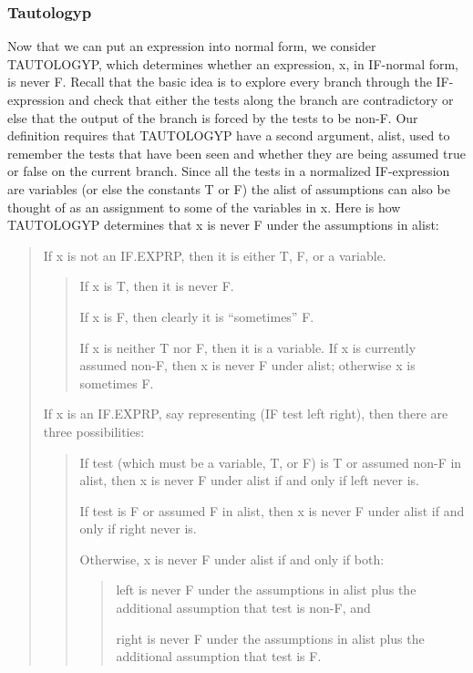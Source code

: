 \documentclass[10pt]{book}
\newenvironment{pubcrown}{\begin{quote}}{\end{quote}}
\begin{document}
\subsubsection{Tautologyp}
Now that we can put an expression into normal form, we
consider TAUTOLOGYP, which
determines whether an expression, x, in IF-normal form, is never F.
Recall that the basic idea is to explore
every branch through the IF-expression and check that either
the tests along the branch are contradictory or else that the output
of the branch is forced by the tests to be non-F.  Our definition
requires that TAUTOLOGYP have a second argument, alist,
used to remember the tests that have been seen and whether
they are being assumed true or false on the current branch. 
Since all the tests in a normalized IF-expression are variables (or else
the constants T or F) the alist of assumptions can also be thought of as an assignment to some
of the variables in x.
Here is how TAUTOLOGYP determines that x is never F under the assumptions in alist:
\begin{pubcrown}
If x is not an IF.EXPRP, then it is either T, F, or a variable.
\begin{pubcrown}
If x is T, then it is never F.

If x is F, then clearly it is ``sometimes'' F.

If x is neither T nor F, then it is a variable. If x is currently
assumed non-F, then x is never F under  alist;
otherwise x is sometimes F.
\end{pubcrown}

If x is an IF.EXPRP, say representing (IF test left right), then there
are three possibilities:
\begin{pubcrown}
If test (which must be a variable, T, or F) is T or assumed non-F in
alist, then x is never F under alist if and
only if left never is.

If test is F or assumed F in alist, then x is never F under
alist if and only if right never is.

Otherwise, x is never F under alist if and only
if both:
\begin{pubcrown}
left is never F under the assumptions in alist plus the additional
assumption that test is non-F, and

right is never F under the assumptions in alist plus the additional
assumption that test is F.
\end{pubcrown}
\end{pubcrown}
\end{pubcrown}
\end{document}
